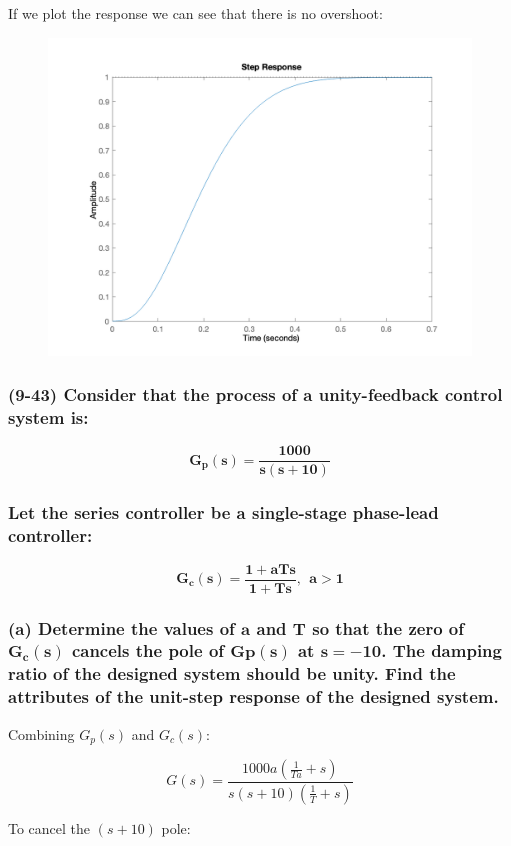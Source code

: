 \documentclass[12pt, letterpaper]{../assignment}
\begin{document}
If we plot the response we can see that there is no overshoot:

\begin{figure}[H]
    \centering
    \includegraphics[width=0.85\linewidth]{./figures/step_repsonse.png}
\end{figure}

\subsubsection*{(9-43) Consider that the process of a unity-feedback control system is:}

$$ \mathbf{G_p(s) = \frac{1000}{s(s+10)} } $$

\subsubsection*{Let the series controller be a single-stage phase-lead controller:}

$$ \mathbf{G_c(s) = \frac{1+a T s}{1 + T s} , \ \ a > 1 } $$

\subsubsection*{(a) Determine the values of $\mathbf{a}$ and $\mathbf{T}$ so that the zero of $\mathbf{G_c(s)}$ cancels the pole of $\mathbf{Gp(s)}$ at $\mathbf{s = -10}$.
The damping ratio of the designed system should be unity.
Find the attributes of the unit-step response of the designed system.}

Combining $G_p(s)$ and $G_c(s)$:

$$ G(s) = \frac{1000a (\frac{1}{Ta}+ s)}{s(s+10)(\frac{1}{T} +s)} $$

To cancel the $(s+10)$ pole:
\end{document}
